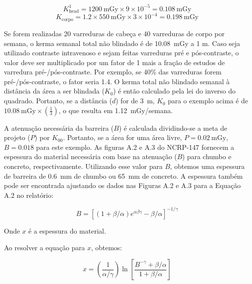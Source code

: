 \documentclass[11pt,a4paper]{article}
\newcounter{exemplo}
\begin{document}
	\begin{equation}
		K_{\text{head}}^1 = \SI{1200}{\milli\gray} \times 9 \times 10^{-5} = \SI{0.108}{\milli\gray}
	\end{equation}
	\begin{equation}
	K_{\text{corpo}} = 1.2 \times \SI{550}{\milli\gray} \times 3 \times 10^{-4} = \SI{0.198}{\milli\gray}
	\end{equation}

	Se forem realizadas 20 varreduras de cabeça e 40 varreduras de corpo por semana, o kerma semanal total não blindado é de \SI{10.08}{\milli\gray} a 1 m. Caso seja utilizado contraste intravenoso e sejam feitas varreduras pré e pós-contraste, o valor deve ser multiplicado por um fator de 1 mais a fração de estudos de varredura pré-/pós-contraste. Por exemplo, se 40\% das varreduras forem pré-/pós-contraste, o fator seria 1.4. O kerma total não blindado semanal à distância da área a ser blindada (\(K_0\)) é então calculado pela lei do inverso do quadrado. Portanto, se a distância (\(d\)) for de \SI{3}{\meter}, \(K_0\) para o exemplo acima é de \(\SI{10.08}{\milli\gray} \times \left(\frac{1}{3}\right)\), o que resulta em \SI{1.12}{\milli\gray}/semana.

	A atenuação necessária da barreira (\(B\)) é calculada dividindo-se a meta de projeto (\(P\)) por \(K_00\). Portanto, se a área for uma área livre, \(P = \SI{0.02}{\milli\gray}\), \(B = 0.018\) para este exemplo. As figuras A.2 e A.3 do NCRP-147 fornecem a espessura do material necessária com base na atenuação (\(B\)) para chumbo e concreto, respectivamente. Utilizando esse valor para \(B\), obtemos uma espessura de barreira de \SI{0.6}{\milli\meter} de chumbo ou \SI{65}{\milli\meter} de concreto. A espessura também pode ser encontrada ajustando os dados nas Figuras A.2 e A.3 para a Equação A.2 no relatório:
	
	\begin{equation}
		B = \left[\left(1 + \beta/\alpha\right) e^{\alpha \beta \gamma} - \beta/\alpha\right]^{-1/\gamma}
	\end{equation}

	Onde \(x\) é a espessura do material.

	Ao resolver a equação para \(x\), obtemos:

	\begin{equation}
		x = \left(\frac{1}{\alpha/\gamma}\right) \ln \left[\frac{B^{-\gamma} + \beta/\alpha}{1 + \beta/\alpha}\right]
	\end{equation}
\end{document}
